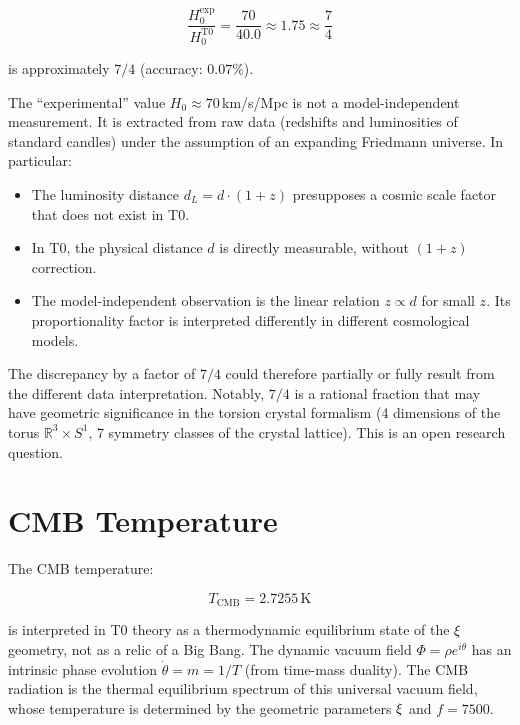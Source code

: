 \begin{equation}
\frac{H_0^{\text{exp}}}{H_0^{\text{T0}}} = \frac{70}{40.0} \approx 1.75 \approx \frac{7}{4}
\label{eq:H0_ratio}
\end{equation}

is approximately $7/4$ (accuracy: $0.07\%$).

\begin{remark}
	The ``experimental'' value $H_0 \approx 70\,$km/s/Mpc is not a 
	model-independent measurement. It is extracted from raw data (redshifts 
	and luminosities of standard candles) under the assumption of an expanding 
	Friedmann universe. In particular:
	\begin{itemize}
	\item The luminosity distance $d_L = d \cdot (1+z)$ presupposes a 
	cosmic scale factor that does not exist in T0.
	\item In T0, the physical distance $d$ is directly measurable, without 
	$(1+z)$ correction.
	\item The model-independent observation is the linear relation 
	$z \propto d$ for small $z$. Its proportionality factor is interpreted 
	differently in different cosmological models.
	\end{itemize}
	The discrepancy by a factor of $7/4$ could therefore partially or fully 
	result from the different data interpretation. Notably, $7/4$ is a 
	rational fraction that may have geometric significance in the torsion 
	crystal formalism (4 dimensions of the torus $\mathbb{R}^3 \times S^1$, 
	7 symmetry classes of the crystal lattice). This is an open research 
	question.
\end{remark}

\section{CMB Temperature}

The CMB temperature:

\begin{equation}
T_{\text{CMB}} = 2.7255\,\text{K}
\end{equation}

is interpreted in T0 theory as a thermodynamic equilibrium state of the 
$\xi$ geometry, not as a relic of a Big Bang. The dynamic vacuum field 
$\Phi = \rho e^{i\theta}$ has an intrinsic phase evolution $\dot{\theta} = m 
= 1/T$ (from time-mass duality). The CMB radiation is the thermal equilibrium 
spectrum of this universal vacuum field, whose temperature is determined by the 
geometric parameters $\xi$ and $f = 7500$.


